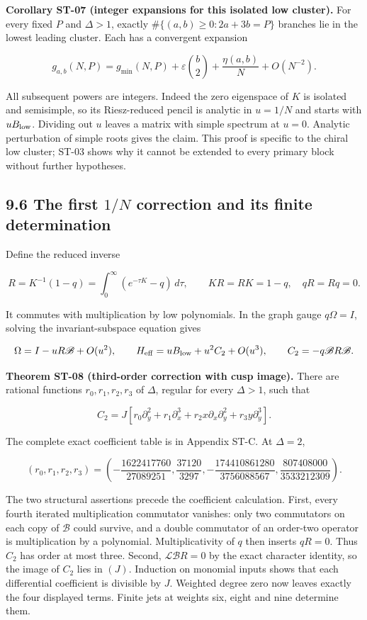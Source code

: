 \textbf{Corollary ST-07 (integer expansions for this isolated low cluster).} For every fixed \(P\) and \(\Delta>1\), exactly \(\#\{(a,b)\geq0:2a+3b=P\}\) branches lie in the lowest leading cluster. Each has a convergent expansion

\[
g_{a,b}(N,P)=g_{\min}(N,P)+
\varepsilon\binom b2+\frac{\eta(a,b)}N+O(N^{-2}).
\]

All subsequent powers are integers. Indeed the zero eigenspace of \(K\) is isolated and semisimple, so its Riesz-reduced pencil is analytic in \(u=1/N\) and starts with \(uB_{\rm low}\). Dividing out \(u\) leaves a matrix with simple spectrum at \(u=0\). Analytic perturbation of simple roots gives the claim. This proof is specific to the chiral low cluster; ST-03 shows why it cannot be extended to every primary block without further hypotheses.

\hypertarget{the-first-1n-correction-and-its-finite-determination}{%
\subsection{\texorpdfstring{9.6 The first \(1/N\) correction and its finite determination}{9.6 The first 1/N correction and its finite determination}}\label{the-first-1n-correction-and-its-finite-determination}}

Define the reduced inverse

\[
R=K^{-1}(1-q)=\int_0^\infty(e^{-\tau K}-q)\,d\tau,
\qquad KR=RK=1-q,\quad qR=Rq=0.
\]

It commutes with multiplication by low polynomials. In the graph gauge \(q\Omega=I\), solving the invariant-subspace equation gives

\[
\Omega=I-uR\mathscr B+O(u^2),\qquad
H_{\rm eff}=uB_{\rm low}+u^2C_2+O(u^3),
\qquad C_2=-q\mathscr BR\mathscr B.
\]

\textbf{Theorem ST-08 (third-order correction with cusp image).} There are rational functions \(r_0,r_1,r_2,r_3\) of \(\Delta\), regular for every \(\Delta>1\), such that

\[
C_2=
J\left[r_0\partial_y^2+r_1\partial_x^3+
r_2x\partial_x\partial_y^2+r_3y\partial_y^3\right].
\]

The complete exact coefficient table is in Appendix ST-C. At \(\Delta=2\),

\[
(r_0,r_1,r_2,r_3)=
\left(-\frac{1622417760}{27089251},
\frac{37120}{3297},
-\frac{174410861280}{3756088567},
\frac{807408000}{3533212309}\right).
\]

The two structural assertions precede the coefficient calculation. First, every fourth iterated multiplication commutator vanishes: only two commutators on each copy of \(\mathscr B\) could survive, and a double commutator of an order-two operator is multiplication by a polynomial. Multiplicativity of \(q\) then inserts \(qR=0\). Thus \(C_2\) has order at most three. Second, \(\mathcal L\mathscr BR=0\) by the exact character identity, so the image of \(C_2\) lies in \((J)\). Induction on monomial inputs shows that each differential coefficient is divisible by \(J\). Weighted degree zero now leaves exactly the four displayed terms. Finite jets at weights six, eight and nine determine them.

